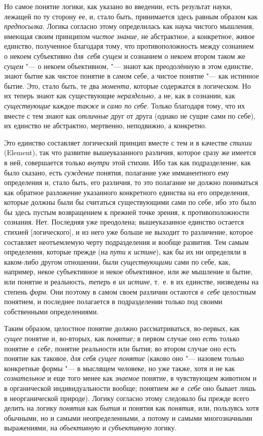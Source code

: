 Но самое понятие логики, как указано во введении, есть результат науки,
лежащей по ту сторону ее, и, стало быть, принимается здесь равным образом
как {\em предпосылка}. Логика согласно этому
определилась как наука чистого мышления, имеющая своим принципом
{\em чистое знание,} не абстрактное, а конкретное,
живое единство, полученное благодаря тому, что
противоположность между сознанием о некоем субъективно {\em для~себя сущем}
и сознанием о некоем втором таком же {\em сущем} "--- о некоем
объективном, "--- знают как преодолённую в этом единстве, знают бытие как
чистое понятие в самом себе, а чистое понятие "--- как истинное бытие.
Это, стало быть, те два
{\em момента,} которые содержатся в логическом. Но их теперь знают как
существующие {\em нераздельно,} а
не, как в сознании, как {\em существующие} каждое {\em также} и
{\em само по себе}. Только благодаря тому, что их вместе с тем знают как
{\em отличные} друг от друга (однако не сущие сами по
себе), их единство не абстрактно, мертвенно, неподвижно, а конкретно.

Это единство составляет логический принцип вместе с тем и в качестве
{\em стихии} (Element), так что развитие вышеуказанного
различия, которое сразу же имеется в ней, совершается только
{\em внутри} этой стихии. Ибо так как подразделение,
как было сказано, есть {\em суждение} понятия,
полагание уже имманентного ему определения и, стало быть, его различия, то
это полагание не должно пониматься как обратное разложение указанного
конкретного единства на его определения, которые должны были бы считаться
существующими сами по себе, ибо это было бы здесь пустым возвращением к
прежней точке зрения, к противоположности сознания. Нет. Последняя уже
преодолена; вышеуказанное единство остается стихией [логического], и из
него уже больше не выходит то различение, которое составляет неотъемлемую
черту подразделения и вообще развития. Тем самым определения, которые
прежде (на {\em пути к истине}), как бы их ни
определяли в каком-либо другом отношении, были
{\em существующими} сами по себе, как, например, некое
субъективное и некое объективное, или же мышление и бытие, или понятие и
реальность, {\em теперь в их истине,} т.~е. в их
единстве, низведены на степень {\em форм}. Они поэтому
в самом своем различии остаются {\em в~себе} целостным
понятием, и последнее полагается в подразделении только под своими
собственными определениями.

Таким образом, целостное понятие должно рассматриваться, во-первых, как
{\em сущее} понятие и, во-вторых, как {\em понятие;} в первом случае оно
{\em есть} только понятие {\em в~себе,} понятие реальности или бытия;
во втором случае оно есть понятие как таковое, {\em для себя сущее понятие}
(каково оно "--- назовем только конкретные формы "--- в мыслящем человеке,
но уже также, хотя и не как {\em сознательное} и еще того менее как
{\em знаемое} понятие, в чувствующем животном и в
органической индивидуальности вообще; понятием же
{\em в~себе} оно бывает лишь в неорганической природе).
Логику согласно этому следовало бы прежде всего делить на логику
{\em понятия} как {\em бытия} и понятия как {\em понятия,} или, пользуясь
хотя обычными, но и самыми неопределенными, а потому и самыми многозначными
выражениями, на {\em объективную} и {\em субъективную} логику.

